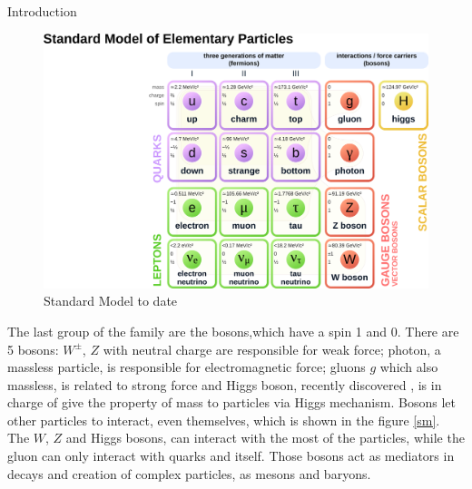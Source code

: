\begin{chapter}{Introduction}
\begin{center}
    \begin{figure}[!htbp]
        \centering
        \includegraphics[scale=0.3]{Chapter1/sm1.png}
        \caption[Standard Model to date]{Standard Model to date \protect \footnotemark}
        \label{sm1}
    \end{figure}
\end{center}

The last group of the family are the bosons,which have a spin 1 and 0. 
There are 5 bosons: $W^{\pm}$, $Z$ with neutral charge are responsible for weak force; photon, a massless particle, is responsible for electromagnetic force; gluons $g$ which also massless, is related to strong force and Higgs boson, recently discovered , is in charge of give the property of mass to particles via Higgs mechanism. Bosons let other particles to interact, even themselves, which is shown in the figure \ref{sm}. 
\\
The $W$, $Z$ and Higgs bosons, can interact with the most of the particles, while the gluon can only interact with quarks and itself.
Those bosons act as mediators in decays and creation of complex
particles, as mesons and baryons.\\



\end{chapter}
